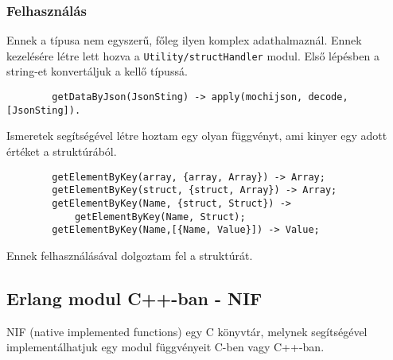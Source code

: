 	\subsubsection{Felhasználás}
	Ennek a típusa nem egyszerű, főleg ilyen komplex adathalmaznál. Ennek kezelésére létre lett hozva a \texttt{Utility/structHandler} modul. \newline 
	Első lépésben a string-et konvertáljuk a kellő típussá. 
	\begin{verbatim}
		getDataByJson(JsonSting) -> apply(mochijson, decode, [JsonSting]).
	\end{verbatim}
	Ismeretek segítségével létre hoztam egy olyan függvényt, ami kinyer egy adott értéket a struktúrából.
	\begin{verbatim}
		getElementByKey(array, {array, Array}) -> Array;
		getElementByKey(struct, {struct, Array}) -> Array;
		getElementByKey(Name, {struct, Struct}) -> 
		    getElementByKey(Name, Struct);
		getElementByKey(Name,[{Name, Value}]) -> Value;
	\end{verbatim}
	Ennek felhasználásával dolgoztam fel a struktúrát.

\subsection{\label{subsec:nif} Erlang modul C++-ban - NIF}

	NIF \cite{erl_nif} (native implemented functions) egy C könyvtár, melynek segítségével implementálhatjuk egy modul függvényeit C-ben vagy C++-ban. 
